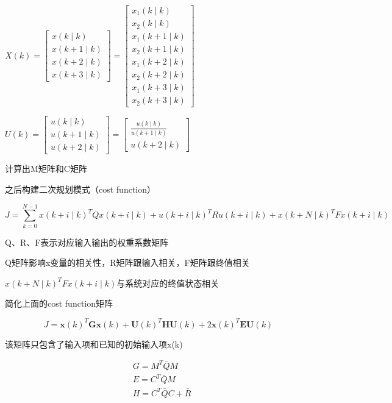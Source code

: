 $X(k)=\left[\begin{array}{c}x(k \mid k) \\x(k+1 \mid k) \\x(k+2 \mid k) \\x(k+3 \mid k)\end{array}\right]=\left[\begin{array}{c}x_{1}(k \mid k) \\x_{2}(k \mid k) \\x_{1}(k+1 \mid k) \\x_{2}(k+1 \mid k) \\x_{1}(k+2 \mid k) \\x_{2}(k+2 \mid k) \\x_{1}(k+3 \mid k) \\x_{2}(k+3 \mid k)\end{array}\right]$

$U(k)=\left[\begin{array}{c}u(k \mid k) \\u(k+1 \mid k) \\u(k+2 \mid k)\end{array}\right]=\left[\begin{array}{c}\frac{u(k \mid k)}{u(k+1 \mid k)} \\u(k+2 \mid k)\end{array}\right]$

计算出M矩阵和C矩阵

之后构建二次规划模式（cost function）\cite{ArtE7}

$$
J=\sum_{k=0}^{N-1} x(k+i \mid k)^{T} Q x(k+i \mid k)+u(k+i \mid k)^{T} R u(k+i \mid k)+x(k+N \mid k)^{T} F x(k+i \mid k)
$$

Q、R、F表示对应输入输出的权重系数矩阵

Q矩阵影响x变量的相关性，R矩阵跟输入相关，F矩阵跟终值相关

$x(k+N \mid k)^{T} F x(k+i \mid k)$与系统对应的终值状态相关

简化上面的cost function矩阵

$$
J=\boldsymbol{x}(k)^{T} \boldsymbol{G} \boldsymbol{x}(k)+\boldsymbol{U}(k)^{T} \boldsymbol{H} \boldsymbol{U}(k)+2 \boldsymbol{x}(k)^{T} \boldsymbol{E} \boldsymbol{U}(k)
$$

该矩阵只包含了输入项和已知的初始输入项x(k)

$$
\begin{aligned}&G=M^{T} \bar{Q} M \\&E=C^{T} \bar{Q} M \\&H=C^{T} \bar{Q} C+\bar{R}\end{aligned}
$$

